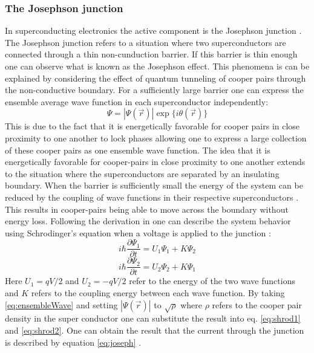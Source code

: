 \subsubsection{The Josephson junction}
In superconducting electronics the active component is the Josephson junction \cite{Duzer_1999_Princip_Super}. The Josephson junction refers to a situation where two superconductors are connected through a thin non-cunduction barrier. If this barrier is thin enough one can observe what is known as the Josephson effect. This phenomena is can be explained by considering the effect of quantum tunneling of cooper pairs through the non-conductive boundary. For a sufficiently large barrier one can express the ensemble average wave function in each superconductor independently\cite{Duzer_1999_Princip_Super}:
\begin{equation}
    \Psi = |\Psi(\Vec{r})| \exp{\{i\theta(\Vec{r})\}}
    \label{eq:ensembleWave}
\end{equation}
This is due to the fact that it is energetically favorable for cooper pairs in close proximity to one another to lock phases \cite{Duzer_1999_Princip_Super} allowing one to express a large collection of these cooper pairs as one ensemble wave function. The idea that it is energetically favorable for cooper-pairs in close proximity to one another extends to the situation where the superconductors are separated by an insulating boundary. When the barrier is sufficiently small the energy of the system can be reduced by the coupling of wave functions in their respective superconductors \cite{Duzer_1999_Princip_Super}. This results in cooper-pairs being able to move across the boundary without energy loss. Following the derivation in \cite{Feynman_Leighton_Sands_2013} one can describe the system behavior using Schrodinger's equation when a voltage is applied to the junction \cite{Feynman_Leighton_Sands_2013}: 
\begin{equation}
    i\hbar \frac{\partial\Psi_1}{\partial t} = U_1\Psi_1 +K\Psi_2 
    \label{eq:shrod1}
\end{equation}
\begin{equation}
    i\hbar \frac{\partial\Psi_2}{\partial t} = U_2\Psi_2 +K\Psi_1
    \label{eq:shrod2}
\end{equation}
Here $U_1 = qV/2$ and $U_2 = -qV/2$ \cite{Feynman_Leighton_Sands_2013} refer to the energy of the two wave functions and $K$ refers to the coupling energy between each wave function. By taking \ref{eq:ensembleWave} and setting $|\Psi(\Vec{r})|$ to $\sqrt{\rho}$ where $\rho$ refers to the cooper pair density in the super conductor one can substitute the result into eq. \ref{eq:shrod1} and \ref{eq:shrod2}. One can obtain the result that the current through the junction is described by equation \ref{eq:joseph} \cite{Feynman_Leighton_Sands_2013}.
